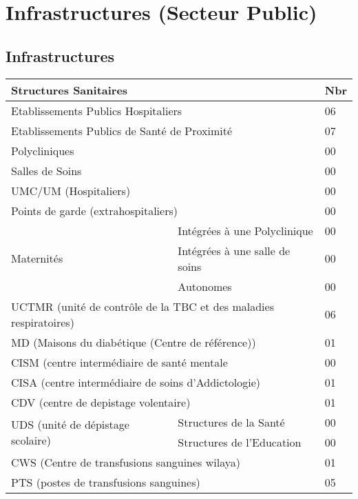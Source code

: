 \section{Infrastructures (Secteur Public)}
\subsection{Infrastructures}
\begin{table}[h!]
\begin{center}
\begin{tabular}{|p{6cm}|p{6cm}|p{1cm}|}
 \hline
 \multicolumn{2}{|l|}{Structures Sanitaires}                                    &Nbr\\
 \hline
 \multicolumn{2}{|l|}{Etablissements Publics Hospitaliers}                      &06 \\
 \multicolumn{2}{|l|}{Etablissements Publics de Santé de Proximité}             &07 \\
 \multicolumn{2}{|l|}{Polycliniques}                                            &00 \\
 \multicolumn{2}{|l|}{Salles de Soins}                                          &00 \\
 \multicolumn{2}{|l|}{UMC/UM (Hospitaliers)}                                    &00 \\
 \multicolumn{2}{|l|}{Points de  garde  (extrahospitaliers)}                    &00 \\
 \hline
 \multirow{3}{*}{Maternités}&Intégrées à une Polyclinique                       &00\\
                            &Intégrées  à une salle de soins                    &00\\
                            &Autonomes                                          &00\\ 
 \hline
 \multicolumn{2}{|l|}{UCTMR (unité de contrôle de la TBC et des maladies respiratoires)}                                                    &06 \\
 \multicolumn{2}{|l|}{MD (Maisons du diabétique (Centre de référence))}         &01 \\
 \multicolumn{2}{|l|}{CISM (centre  intermédiaire de santé mentale}             &00 \\
 \multicolumn{2}{|l|}{CISA (centre intermédiaire de soins  d’Addictologie)}     &01 \\
 \multicolumn{2}{|l|}{CDV (centre de depistage volentaire)}                     &01 \\
 \hline
 \multirow{2}{*}{UDS (unité de dépistage scolaire)}&Structures de la Santé      &00\\
                                                   &Structures de l’Education   &00\\
 \hline
 \multicolumn{2}{|l|}{CWS (Centre de transfusions sanguines wilaya)}            &01 \\
 \multicolumn{2}{|l|}{PTS (postes  de transfusions sanguines)}                  &05 \\
 

\end{tabular}
\end{center}
\end{table}
